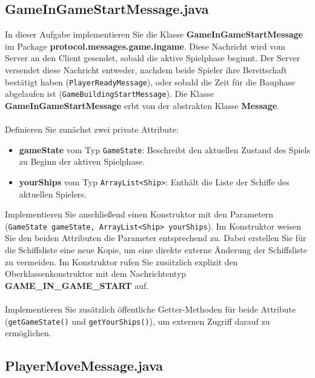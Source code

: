 \documentclass[12pt]{article}
\begin{document}
\subsection*{GameInGameStartMessage.java}

In dieser Aufgabe implementieren Sie die Klasse \textbf{GameInGameStartMessage} im Package \textbf{protocol.messages.game.ingame}. Diese Nachricht wird vom Server an den Client gesendet, sobald die aktive Spielphase beginnt. Der Server versendet diese Nachricht entweder, nachdem beide Spieler ihre Bereitschaft bestätigt haben (\texttt{PlayerReadyMessage}), oder sobald die Zeit für die Bauphase abgelaufen ist (\texttt{GameBuildingStartMessage}). Die Klasse \textbf{GameInGameStartMessage} erbt von der abstrakten Klasse \textbf{Message}.
\\ \\
Definieren Sie zunächst zwei private Attribute:
\begin{itemize}
    \item \textbf{gameState} vom Typ \texttt{GameState}: Beschreibt den aktuellen Zustand des Spiels zu Beginn der aktiven Spielphase.
    \item \textbf{yourShips} vom Typ \texttt{ArrayList<Ship>}: Enthält die Liste der Schiffe des aktuellen Spielers.
\end{itemize}

Implementieren Sie anschließend einen Konstruktor mit den Parametern (\texttt{GameState gameState, ArrayList<Ship> yourShips}). Im Konstruktor weisen Sie den beiden Attributen die Parameter entsprechend zu. Dabei erstellen Sie für die Schiffsliste eine neue Kopie, um eine direkte externe Änderung der Schiffsliste zu vermeiden. Im Konstruktor rufen Sie zusätzlich explizit den Oberklassenkonstruktor mit dem Nachrichtentyp \textbf{GAME\_IN\_GAME\_START} auf.
\\ \\
Implementieren Sie zusätzlich öffentliche Getter-Methoden für beide Attribute (\texttt{getGameState()} und \texttt{getYourShips()}), um externen Zugriff darauf zu ermöglichen.

\subsection*{PlayerMoveMessage.java}
\end{document}
